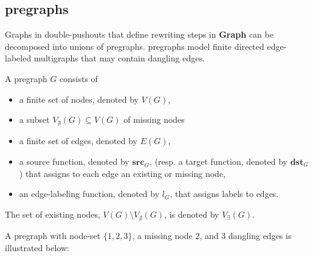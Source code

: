 \subsection{pregraphs}
Graphs in double-pushouts that define rewriting steps in \textbf{Graph} can be decomposed into unions of pregraphs. pregraphs model finite directed edge-labeled multigraphs that may contain dangling edges.
\begin{definition}
    \label{def:pregraph}
    A pregraph $G$ consists of
    \begin{itemize}
        \item a finite set of nodes, denoted by $V(G)$,
        \item a subset $V_{\nexists}(G) \subseteq V(G)$ of missing nodes
        \item a finite set of edges, denoted by $E(G)$,
        \item a source function, denoted by \( \textbf{src}_G \), (resp. a target function, denoted by \( \textbf{dst}_G \)) that assigns to each edge an existing or missing node,
        \item an edge-labeling function, denoted by $l_G$, that assigns labels to edges.
    \end{itemize}
\end{definition} 
The set of existing nodes, $V(G) \setminus V_{\nexists}(G)$, is denoted by $V_\exists(G)$.

 \begin{example}
    \label{def:pregraph}
     A pregraph with node-set $\{1,2,3\}$, a missing node $2$, and 3 dangling edges is illustrated below:
     \begin{center}
    \end{center}
 \end{example} 
 
